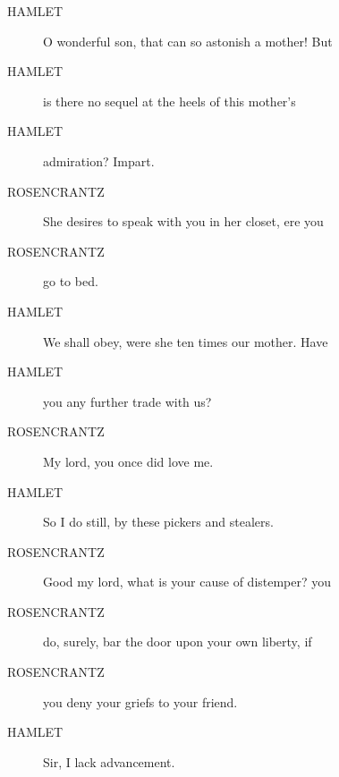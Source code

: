 \documentclass{article}
\begin{document}
\begin{description}
            
\item[HAMLET] O wonderful son, that can so astonish a mother! But
\item[HAMLET] is there no sequel at the heels of this mother's
\item[HAMLET] admiration? Impart.
\end{description}
          
\begin{description}
            
\item[ROSENCRANTZ] She desires to speak with you in her closet, ere you
\item[ROSENCRANTZ] go to bed.
\end{description}
          
\begin{description}
            
\item[HAMLET] We shall obey, were she ten times our mother. Have
\item[HAMLET] you any further trade with us?
\end{description}
          
\begin{description}
            
\item[ROSENCRANTZ] My lord, you once did love me.
\end{description}
          
\begin{description}
            
\item[HAMLET] So I do still, by these pickers and stealers.
\end{description}
          
\begin{description}
            
\item[ROSENCRANTZ] Good my lord, what is your cause of distemper? you
\item[ROSENCRANTZ] do, surely, bar the door upon your own liberty, if
\item[ROSENCRANTZ] you deny your griefs to your friend.
\end{description}
          
\begin{description}
            
\item[HAMLET] Sir, I lack advancement.
\end{description}
          
\end{document}
